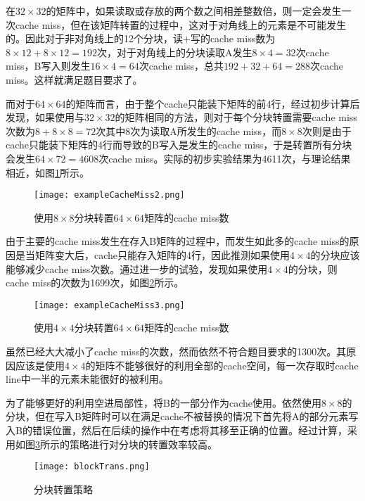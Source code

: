 \par 在$32\times 32$的矩阵中，如果读取或存放的两个数之间相差整数倍，则一定会发生一次cache miss，但在该矩阵转置的过程中，这对于对角线上的元素是不可能发生的。因此对于非对角线上的12个分块，读+写的cache miss数为$8\times 12 + 8\times 12 = 192$次，对于对角线上的分块读取A发生$8\times 4 = 32$次cache miss，B写入则发生$16\times 4 = 64$次cache miss，总共$192 + 32 + 64 = 288$次cache miss。这样就满足题目要求了。

\par 而对于$64\times 64$的矩阵而言，由于整个cache只能装下矩阵的前4行，经过初步计算后发现，如果使用与$32\times 32$的矩阵相同的方法，则对于每个分块转置需要cache miss次数为$8 + 8\times 8 = 72$次其中8次为读取A所发生的cache miss，而$8\times 8$次则是由于cache只能装下矩阵的4行而导致的B写入是发生的cache miss，于是转置所有分块会发生$64\times 72 = 4608$次cache miss。实际的初步实验结果为4611次，与理论结果相近，如图\ref{fig:exampleCacheMiss2}所示。

\begin{figure}[htb]
    \centering
    \texttt{[image: exampleCacheMiss2.png]}
    \caption{使用$8\times 8$分块转置$64\times 64$矩阵的cache miss数}
    \label{fig:exampleCacheMiss2}
\end{figure}

\par 由于主要的cache miss发生在存入B矩阵的过程中，而发生如此多的cache miss的原因是当矩阵变大后，cache只能存入矩阵的4行，因此推测如果使用$4\times 4$的分块应该能够减少cache miss次数。通过进一步的试验，发现如果使用$4\times 4$的分块，则cache miss的次数为1699次，如图\ref{fig:exampleCacheMiss3}所示。
\begin{figure}[htb]
    \centering
    \texttt{[image: exampleCacheMiss3.png]}
    \caption{使用$4\times 4$分块转置$64\times 64$矩阵的cache miss数}
    \label{fig:exampleCacheMiss3}
\end{figure}

\par 虽然已经大大减小了cache miss的次数，然而依然不符合题目要求的1300次。其原因应该是使用$4\times 4$的矩阵不能够很好的利用全部的cache空间，每一次存取时cache line中一半的元素未能很好的被利用。
\par 为了能够更好的利用空进局部性，将B的一部分作为cache使用。依然使用$8\times 8$的分块，但在写入B矩阵时可以在满足cache不被替换的情况下首先将A的部分元素写入B的错误位置，然后在后续的操作中在考虑将其移至正确的位置。经过计算，采用如图\ref{fig:blockTrans}所示的策略进行对分块的转置效率较高。
\begin{figure}[htb]
    \centering
    \texttt{[image: blockTrans.png]}
    \caption{分块转置策略}
    \label{fig:blockTrans}
\end{figure}

